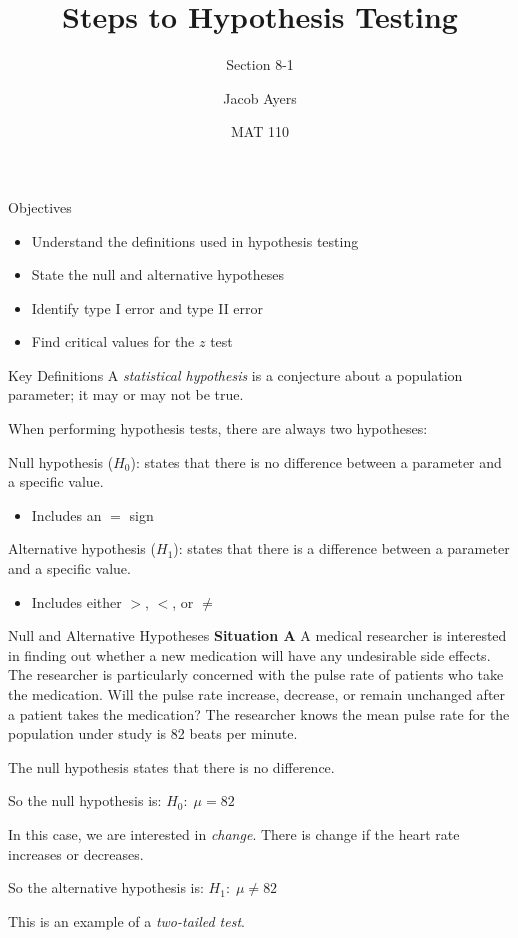\documentclass[t, aspectratio=169]{beamer}
\title[8-1]{Steps to Hypothesis Testing}
\subtitle{Section 8-1}
\author{Jacob Ayers}
\institute{Lesson \#24}
\date{MAT 110}
\newcommand{\?}{\stackrel{?}{=}}
\begin{document}
	
	\begin{frame}
		\titlepage
	\end{frame}
	
	\begin{frame}{Objectives}
		\begin{itemize}
			\item Understand the definitions used in hypothesis testing
			\item State the null and alternative hypotheses
			\item Identify type I error and type II error
			\item Find critical values for the $z$ test
		\end{itemize}
	\end{frame}

	\begin{frame}{Key Definitions}
		A \textit{statistical hypothesis} is a conjecture about a population parameter; it may or may not be true. \pause
		
		When performing hypothesis tests, there are always two hypotheses: \pause
		
		Null hypothesis ($H_0$): states that there is no difference between a parameter and a specific value. \begin{itemize}
			\item Includes an $=$ sign
		\end{itemize} \pause
		
		Alternative hypothesis ($H_1$): states that there is a difference between a parameter and a specific value. \begin{itemize}
			\item Includes either $>$, $<$, or $\neq$
		\end{itemize} \pause
	\end{frame}

	\begin{frame}{Null and Alternative Hypotheses}
		\textbf{Situation A} A medical researcher is interested in finding out whether a new medication will have any undesirable side effects. The researcher is particularly concerned with the pulse rate of patients who take the medication. Will the pulse rate increase, decrease, or remain unchanged after a patient takes the medication?
		The researcher knows the mean pulse rate for the population under study is 82 beats per minute. \pause
		
		The null hypothesis states that there is no difference. \pause
		
		So the null hypothesis is: $H_0: \; \mu = 82$ \pause
		
		In this case, we are interested in \textit{change}. There is change if the heart rate increases or decreases. \pause
		
		So the alternative hypothesis is: $H_1: \; \mu \neq 82$ \pause
		
		This is an example of a \textit{two-tailed test}.
	\end{frame}
\end{document}

